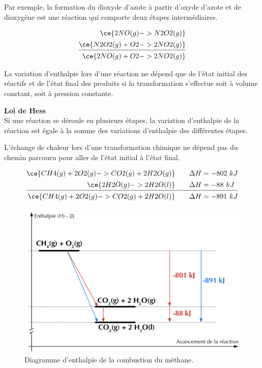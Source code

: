 \documentclass[
  11pt,
  french,
  a4paper,
  openany]{book}
\begin{document}
Par exemple, la formation du dioxyde d'azote à partir d'oxyde d'azote et de dioxygène est une réaction qui comporte deux étapes intermédiaires.

\[
\begin{split}
\ce{2 NO(g) -> N2O2(g)} \\[0.1em]
\ce{N2O2(g) + O2 -> 2NO2(g)} \\[0.1em]
\hline\\[-1.2em]
\ce{2 NO(g) + O2 -> 2NO2(g)}
\end{split}
\]

La variation d'enthalpie lors d'une réaction ne dépend que de l'état initial des réactifs et de l'état final des produits si la transformation s'effectue soit à volume constant, soit à pression constante.

\begin{tcolorbox}
\textbf{Loi de Hess}\\
Si une réaction se déroule en plusieurs étapes, la variation d'enthalpie de la réaction est égale à la somme des variations d'enthalpie des différentes étapes.

\end{tcolorbox}

L'échange de chaleur lors d'une transformation chimique ne dépend pas du chemin parcouru pour aller de l'état initial à l'état final.

\[
\begin{split}
\ce{CH4(g) + 2 O2(g) -> CO2(g) + 2 H2O(g)} \qquad \Delta H &= -802\ kJ \\[0.1em]
\ce{2 H2O(g) -> 2 H2O(l)} \qquad \Delta H &= -88\ kJ \\[0.1em]
\hline\\[-1.2em]
\ce{CH4(g) + 2 O2(g) -> CO2(g) + 2 H2O(l)} \qquad \Delta H &= -891\ kJ
\end{split}
\]

\begin{figure}

{\centering \includegraphics[width=0.67\linewidth]{images/Enthalpie-2} 

}

\caption{Diagramme d'enthalpie de la combustion du méthane.}\label{fig:enthalpie-2}
\end{figure}
\clearpage
\end{document}
